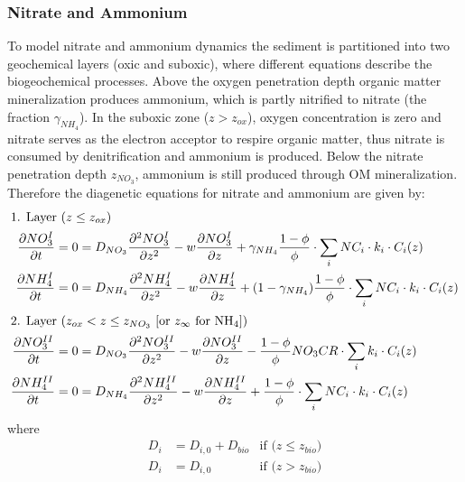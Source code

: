 \documentclass[gmd, manuscript]{copernicus}
\begin{document}
\subsubsection{Nitrate and Ammonium}
To model nitrate and ammonium dynamics the sediment is partitioned into two geochemical layers (oxic and suboxic), where different equations describe the biogeochemical processes. 
Above the oxygen penetration depth organic matter mineralization produces ammonium, which is partly nitrified to nitrate (the fraction $\gamma_{NH_4}$). 
In the suboxic zone ($z>z_{ox}$), oxygen concentration is zero and nitrate serves as the electron acceptor to respire organic matter, thus nitrate is consumed by denitrification and ammonium is produced. Below the nitrate 
penetration depth $z_{NO_3}$, ammonium is still produced through OM mineralization. Therefore the diagenetic equations for nitrate and ammonium are given by:
\begin{align}
\intertext{1. Layer ($z \leq z_{ox}$)}
 \frac{\partial NO_3^I}{\partial t} &= 0 = D_{NO_3} \frac{\partial^2NO_3^I }{\partial z^2} - w\frac{\partial NO_3^I }{\partial z} + \gamma_{NH_4} \frac{1-\phi}{\phi} \cdot \sum_i NC_i \cdot k_i \cdot C_{i}(z)\label{eq:NO3_ODE1_L1}\\ %
 \frac{\partial NH_4^I}{\partial t} &= 0 = D_{NH_4} \frac{\partial^2NH_4^I }{\partial z^2} - w\frac{\partial NH_4^I }{\partial z} + (1-\gamma_{NH_4}) \frac{1-\phi}{\phi} \cdot \sum_i NC_i \cdot k_i \cdot C_{i}(z)\label{eq:NH4_ODE1_L1}\\
 \intertext{2. Layer ($z_{ox} < z \leq z_{NO_3}$ [or $z_\infty$ for NH$_4$])} 
\frac{\partial NO_3^{II}}{\partial t} &= 0 = D_{NO_3} \frac{\partial^2NO_3^{II} }{\partial z^2} - w\frac{\partial NO_3^{II} }{\partial z} - \frac{1-\phi}{\phi} NO_3CR \cdot \sum_i k_i \cdot C_{i}(z) \label{eq:NO3_ODE1_L2}\\
\frac{\partial NH_4^{II}}{\partial t} &= 0 = D_{NH_4} \frac{\partial^2NH_4^{II} }{\partial z^2} - w\frac{\partial NH_4^{II} }{\partial z} + \frac{1-\phi}{\phi} \cdot \sum_i NC_i \cdot k_i \cdot C_{i}(z)\label{eq:NH4_ODE1_L2}
\end{align}
where
\begin{align}
 D_{i}&=D_{i, 0}+D_{bio} &\text{if ($z\leq z_{bio}$)}\\
 D_{i}&=D_{i, 0}                &\text{if ($z > z_{bio}$)} 
\end{align} 
\end{document}
